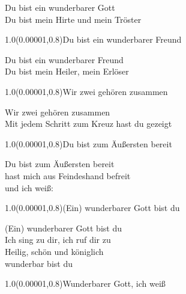 \documentclass[aspectratio=169]{beamer}
\begin{document}
\color{white}
\begin{frame}
\centering
\color{white}
\huge{Du bist ein wunderbarer Gott} \\
\huge{Du bist mein Hirte und mein Tröster} \\

\begin{textblock}{1.0}(0.00001,0.8)\color{gray}\normalsize{Du bist ein wunderbarer Freund}\end{textblock}
\end{frame}

\begin{frame}
\centering
\color{white}
\huge{Du bist ein wunderbarer Freund} \\
\huge{Du bist mein Heiler, mein Erlöser} \\

\begin{textblock}{1.0}(0.00001,0.8)\color{gray}\normalsize{Wir zwei gehören zusammen}\end{textblock}
\end{frame}

\begin{frame}
\centering
\color{white}
\huge{Wir zwei gehören zusammen} \\
\huge{Mit jedem Schritt zum Kreuz hast du gezeigt} \\

\begin{textblock}{1.0}(0.00001,0.8)\color{gray}\normalsize{Du bist zum Äußersten bereit}\end{textblock}
\end{frame}

\begin{frame}
\centering
\color{white}
\huge{Du bist zum Äußersten bereit} \\
\huge{hast mich aus Feindeshand befreit} \\
\huge{und ich weiß:} \\

\begin{textblock}{1.0}(0.00001,0.8)\color{gray}\normalsize{(Ein) wunderbarer Gott bist du}\end{textblock}
\end{frame}

\begin{frame}
\centering
\color{white}
\huge{(Ein) wunderbarer Gott bist du} \\
\huge{Ich sing zu dir, ich ruf dir zu} \\
\huge{Heilig, schön und königlich} \\
\huge{wunderbar bist du} \\

\begin{textblock}{1.0}(0.00001,0.8)\color{gray}\normalsize{Wunderbarer Gott, ich weiß}\end{textblock}
\end{frame}
\end{document}
